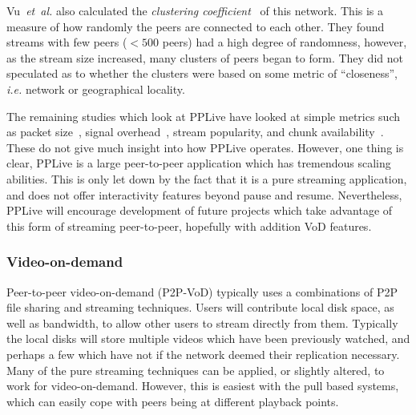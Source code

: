     Vu~\emph{et~al.} also calculated the \emph{clustering coefficient}~\cite{watts1998cds} of this network. This is a measure of how randomly the peers are connected to each other. They found streams with few peers ($<500$ peers) had a high degree of randomness, however, as the stream size increased, many clusters of peers began to form. They did not speculated as to whether the clusters were based on some metric of ``closeness'', \emph{i.e.} network or geographical locality.

    The remaining studies which look at PPLive have looked at simple metrics such as packet size~\cite{krieger2008aaq}, signal overhead~\cite{silverston2007mpi}, stream popularity, and chunk availability~\cite{huang2008cda}. These do not give much insight into how PPLive operates. However, one thing is clear, PPLive is a large peer-to-peer application which has tremendous scaling abilities. This is only let down by the fact that it is a pure streaming application, and does not offer interactivity features beyond pause and resume. Nevertheless, PPLive will encourage development of future projects which take advantage of this form of streaming peer-to-peer, hopefully with addition VoD features.



\subsubsection{Video-on-demand}

    Peer-to-peer video-on-demand (P2P-VoD) typically uses a combinations of P2P file sharing and streaming techniques. Users will contribute local disk space, as well as bandwidth, to allow other users to stream directly from them. Typically the local disks will store multiple videos which have been previously watched, and perhaps a few which have not if the network deemed their replication necessary. Many of the pure streaming techniques can be applied, or slightly altered, to work for video-on-demand. However, this is easiest with the pull based systems, which can easily cope with peers being at different playback points.

